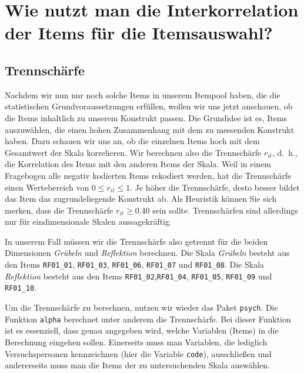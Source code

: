 \documentclass[
  ngerman,
]{book}
\newenvironment{Shaded}{\begin{snugshade}}{\end{snugshade}}
\newcommand{\CommentTok}[1]{\textcolor[rgb]{0.56,0.35,0.01}{\textit{#1}}}
\newcommand{\DecValTok}[1]{\textcolor[rgb]{0.00,0.00,0.81}{#1}}
\newcommand{\FunctionTok}[1]{\textcolor[rgb]{0.13,0.29,0.53}{\textbf{#1}}}
\newcommand{\NormalTok}[1]{#1}
\newcommand{\OtherTok}[1]{\textcolor[rgb]{0.56,0.35,0.01}{#1}}
\newcommand{\SpecialCharTok}[1]{\textcolor[rgb]{0.81,0.36,0.00}{\textbf{#1}}}
\begin{document}
\section{Wie nutzt man die Interkorrelation der Items für die Itemsauswahl?}\label{wie-nutzt-man-die-interkorrelation-der-items-fuxfcr-die-itemsauswahl}

\subsection{Trennschärfe}\label{trennschuxe4rfe}

Nachdem wir nun nur noch solche Items in unserem Itempool haben, die die statistischen Grundvoraussetzungen erfüllen, wollen wir uns jetzt anschauen, ob die Items inhaltlich zu unserem Konstrukt passen. Die Grundidee ist es, Items auszuwählen, die einen hohen Zusammenhang mit dem zu messenden Konstrukt haben. Dazu schauen wir uns an, ob die einzelnen Items hoch mit dem Gesamtwert der Skala korrelieren. Wir berechnen also die Trennschärfe \(r_{it}\), d.~h., die Korrelation des Items mit den anderen Items der Skala. Weil in einem Fragebogen alle negativ kodierten Items rekodiert werden, hat die Trennschärfe einen Wertebereich von \(0 \leq r_{it} \leq 1\). Je höher die Trennschärfe, desto besser bildet das Item das zugrundeliegende Konstrukt ab.
Als Heuristik können Sie sich merken, dass die Trennschärfe \(r_{it} \geq 0.40\) sein sollte. Trennschärfen sind allerdings nur für eindimensionale Skalen aussagekräftig.

In unserem Fall müssen wir die Trennschärfe also getrennt für die beiden Dimensionen \emph{Grübeln} und \emph{Reflektion} berechnen. Die Skala \emph{Grübeln} besteht aus den Items \texttt{RF01\_01}, \texttt{RF01\_03}, \texttt{RF01\_06}, \texttt{RF01\_07} und \texttt{RF01\_08}. Die Skala \emph{Reflektion} besteht aus den Items \texttt{RF01\_02},\texttt{RF01\_04}, \texttt{RF01\_05}, \texttt{RF01\_09} und \texttt{RF01\_10}.

Um die Trennschärfe zu berechnen, nutzen wir wieder das Paket \texttt{psych}. Die Funktion \texttt{alpha} berechnet unter anderem die Trennschärfe. Bei dieser Funktion ist es essenziell, dass genau angegeben wird, welche Variablen (Items) in die Berechnung eingehen sollen. Einerseits muss man Variablen, die lediglich Versuchspersonen kennzeichnen (hier die Variable \texttt{code}), ausschließen und andererseits muss man die Items der zu untersuchenden Skala auswählen.

\begin{Shaded}
\end{Shaded}
\end{document}
